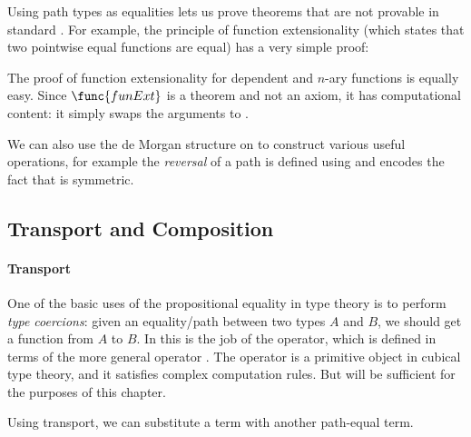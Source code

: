 Using path types as equalities lets us prove theorems that are not provable in
standard \Agda. For example, the principle of function extensionality (which states
that two pointwise equal functions are equal) has a very simple proof:
%
% 

The proof of function extensionality for dependent and $n$-ary
functions is equally easy. Since $\func{funExt}$ is a
theorem and not an axiom, it has computational
content: it simply swaps the arguments to .

We can also use the de Morgan structure on  to construct various
useful operations, for example the \emph{reversal} of a path is defined
using  and encodes the fact that  is symmetric.
%
% 

\subsection{Transport and Composition}

\paragraph*{Transport}
% 
One of the basic uses of the propositional equality in type theory is 
to perform \emph{type coercions}: 
% 
given an equality/path between two types \( A \) and \( B \), we should get
a function from \( A \) to \( B \).
% 
In \CubicalAgda this is the job of the  operator,
which is defined in terms of the more general operator .
%
% 
The  operator is a primitive object in cubical type theory,
and it satisfies complex computation rules.
% 
But  will be sufficient for the purposes of this chapter.

Using transport, we can substitute a term with another path-equal term.
%
% 

